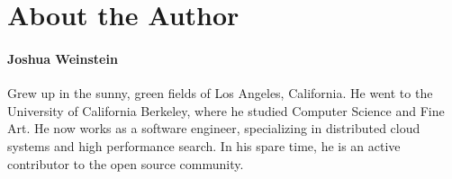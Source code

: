 
\newpage

\section{About the Author}

\paragraph{Joshua Weinstein} Grew up in the sunny, green fields of Los Angeles, California. He went to the University of California Berkeley, where he studied Computer Science and Fine Art. He now works as a software engineer, specializing in distributed cloud systems and high performance search. In his spare time, he is an active contributor to the open source community.